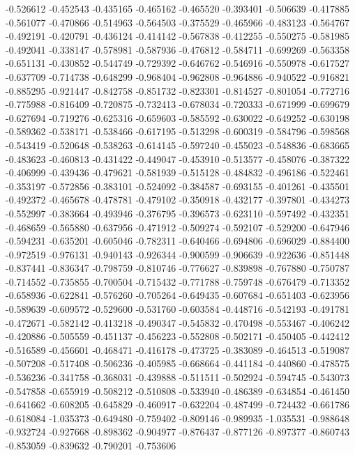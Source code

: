 -0.526612
-0.452543
-0.435165
-0.465162
-0.465520
-0.393401
-0.506639
-0.417885
-0.561077
-0.470866
-0.514963
-0.564503
-0.375529
-0.465966
-0.483123
-0.564767
-0.492191
-0.420791
-0.436124
-0.414142
-0.567838
-0.412255
-0.550275
-0.581985
-0.492041
-0.338147
-0.578981
-0.587936
-0.476812
-0.584711
-0.699269
-0.563358
-0.651131
-0.430852
-0.544749
-0.729392
-0.646762
-0.546916
-0.550978
-0.617527
-0.637709
-0.714738
-0.648299
-0.968404
-0.962808
-0.964886
-0.940522
-0.916821
-0.885295
-0.921447
-0.842758
-0.851732
-0.823301
-0.814527
-0.801054
-0.772716
-0.775988
-0.816409
-0.720875
-0.732413
-0.678034
-0.720333
-0.671999
-0.699679
-0.627694
-0.719276
-0.625316
-0.659603
-0.585592
-0.630022
-0.649252
-0.630198
-0.589362
-0.538171
-0.538466
-0.617195
-0.513298
-0.600319
-0.584796
-0.598568
-0.543419
-0.520648
-0.538263
-0.614145
-0.597240
-0.455023
-0.548836
-0.683665
-0.483623
-0.460813
-0.431422
-0.449047
-0.453910
-0.513577
-0.458076
-0.387322
-0.406999
-0.439436
-0.479621
-0.581939
-0.515128
-0.484832
-0.496186
-0.522461
-0.353197
-0.572856
-0.383101
-0.524092
-0.384587
-0.693155
-0.401261
-0.435501
-0.492372
-0.465678
-0.478781
-0.479102
-0.350918
-0.432177
-0.397801
-0.434273
-0.552997
-0.383664
-0.493946
-0.376795
-0.396573
-0.623110
-0.597492
-0.432351
-0.468659
-0.565880
-0.637956
-0.471912
-0.509274
-0.592107
-0.529200
-0.647946
-0.594231
-0.635201
-0.605046
-0.782311
-0.640466
-0.694806
-0.696029
-0.884400
-0.972519
-0.976131
-0.940143
-0.926344
-0.900599
-0.906639
-0.922636
-0.851448
-0.837441
-0.836347
-0.798759
-0.810746
-0.776627
-0.839898
-0.767880
-0.750787
-0.714552
-0.735855
-0.700504
-0.715432
-0.771788
-0.759748
-0.676479
-0.713352
-0.658936
-0.622841
-0.576260
-0.705264
-0.649435
-0.607684
-0.651403
-0.623956
-0.589639
-0.609572
-0.529600
-0.531760
-0.603584
-0.448716
-0.542193
-0.491781
-0.472671
-0.582142
-0.413218
-0.490347
-0.545832
-0.470498
-0.553467
-0.406242
-0.420886
-0.505559
-0.451137
-0.456223
-0.552808
-0.502171
-0.450405
-0.442412
-0.516589
-0.456601
-0.468471
-0.416178
-0.473725
-0.383089
-0.464513
-0.519087
-0.507208
-0.517408
-0.506236
-0.405985
-0.668664
-0.441184
-0.440860
-0.478575
-0.536236
-0.341758
-0.368031
-0.439888
-0.511511
-0.502924
-0.594745
-0.543073
-0.547858
-0.655919
-0.508212
-0.510808
-0.533940
-0.486389
-0.634854
-0.461450
-0.641662
-0.608205
-0.645829
-0.460917
-0.632204
-0.487499
-0.724432
-0.661786
-0.618084
-1.035373
-0.649480
-0.759402
-0.809146
-0.989935
-1.035531
-0.988648
-0.932724
-0.927668
-0.898362
-0.904977
-0.876437
-0.877126
-0.897377
-0.860743
-0.853059
-0.839632
-0.790201
-0.753606
